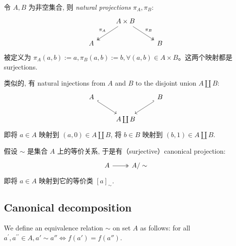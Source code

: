 \begin{eg}\label{eg:1.2.4}
    令 \(A, B\) 为非空集合, 则 \emph{natural projections} \(\pi_A, \pi_B\):
    \[\begin{tikzcd}
            & {A \times B} \\
            A && B
            \arrow["{\pi_A}"', two heads, from=1-2, to=2-1]
            \arrow["{\pi_B}", two heads, from=1-2, to=2-3]
        \end{tikzcd}\]
    被定义为 \(\pi_A(a, b) := a, \pi_B(a, b) := b, \forall (a, b)\in A\times B\)。这两个映射都是 surjections.
\end{eg}
\begin{eg}\label{eg:1.2.5}
    类似的, 有 natural injections from \(A\) and \(B\) to the disjoint union \(A \coprod B\):
    \[\begin{tikzcd}
            A && B \\
            & {A \coprod B}
            \arrow[hook, from=1-1, to=2-2]
            \arrow[hook', from=1-3, to=2-2]
        \end{tikzcd}\]
    即将 \(a \in A\) 映射到 \((a, 0) \in A \coprod B\), 将 \(b \in B\) 映射到 \((b, 1) \in A \coprod B\).
\end{eg}
\begin{eg}\label{eg:1.2.6}
    假设 \(\sim \) 是集合 \(A\) 上的等价关系, 于是有（surjective）canonical projection:
    \[\begin{tikzcd}
            A & {A / \sim}
            \arrow[two heads, from=1-1, to=1-2]
        \end{tikzcd}\]
    即将 \(a \in A\) 映射到它的等价类 \([a]_{\sim }\).
\end{eg}

\subsection{Canonical decomposition}\label{sec:1.2.8}
We define an equivalence relation $\sim$ on set $A$ as follows: for all $a^{\prime}, a^{\prime\prime}\in A, a'\sim a''\iff f(a')=f(a'')$.

